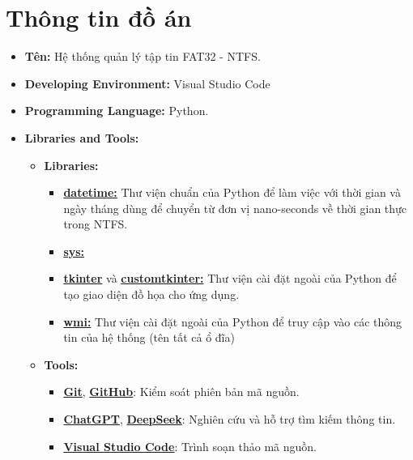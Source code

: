 \section{Thông tin đồ án}
\begin{itemize}
  \item \textbf{Tên:} Hệ thống quản lý tập tin FAT32 - NTFS.
  \item \textbf{Developing Environment:} Visual Studio Code
  \item \textbf{Programming Language:} Python.
  \item \textbf{Libraries and Tools:}
        \begin{itemize}
          \item \textbf{Libraries:}
                \begin{itemize}
                  \item \href{https://docs.python.org/3/library/datetime.html}{\textbf{datetime:}} Thư viện chuẩn của Python để làm việc với thời gian và ngày tháng dùng để chuyển từ đơn vị nano-seconds về thời gian thực trong NTFS.
                  
				  \item \href{https://docs.python.org/3/library/sys.html}{\textbf{sys:}} 
				  
				  \item \href{https://docs.python.org/3/library/tkinter.html}{\textbf{tkinter}} và \href{https://customtkinter.tomschimansky.com/}{\textbf{customtkinter:}} Thư viện cài đặt ngoài của Python để tạo giao diện đồ họa cho ứng dụng.
				  \item \href{https://timgolden.me.uk/python/wmi/tutorial.html}{\textbf{wmi:}} Thư viện cài đặt ngoài của Python để truy cập vào các thông tin của hệ thống (tên tất cả ổ đĩa)
				  
                \end{itemize}
          \item \textbf{Tools:}
                \begin{itemize}
                  \item \href{https://git-scm.com/}{\textbf{Git}}, \href{https://github.com/}{\textbf{GitHub}}: Kiểm soát phiên bản mã nguồn.
                  \item \href{https://chatgpt.com/}{\textbf{ChatGPT}}, \href{https://chat.deepseek.com/}{\textbf{DeepSeek}}: Nghiên cứu và hỗ trợ tìm kiếm thông tin.
                  \item \href{https://code.visualstudio.com/}{\textbf{Visual Studio Code}}: Trình soạn thảo mã nguồn.
                \end{itemize}
        \end{itemize}
\end{itemize}
